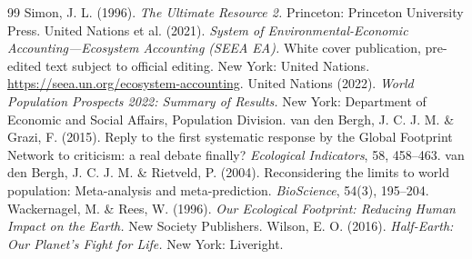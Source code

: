 \documentclass[preprint,12pt,authoryear]{elsarticle}
\begin{document}
\begin{thebibliography}{99}
 Simon, J. L. (1996). \emph{The Ultimate Resource 2.} Princeton: Princeton University Press.
 United Nations et al. (2021). \emph{System of Environmental-Economic Accounting---Ecosystem Accounting (SEEA EA).} White cover publication, pre-edited text subject to official editing. New York: United Nations. \url{https://seea.un.org/ecosystem-accounting}.
 United Nations (2022). \emph{World Population Prospects 2022: Summary of Results.} New York: Department of Economic and Social Affairs, Population Division.
 van den Bergh, J. C. J. M. \& Grazi, F. (2015). Reply to the first systematic response by the Global Footprint Network to criticism: a real debate finally? \emph{Ecological Indicators}, 58, 458--463.
 van den Bergh, J. C. J. M. \& Rietveld, P. (2004). Reconsidering the limits to world population: Meta-analysis and meta-prediction. \emph{BioScience}, 54(3), 195--204.
 Wackernagel, M. \& Rees, W. (1996). \emph{Our Ecological Footprint: Reducing Human Impact on the Earth.} New Society Publishers.
 Wilson, E. O. (2016). \emph{Half-Earth: Our Planet's Fight for Life.} New York: Liveright.
\end{thebibliography}
\end{document}
